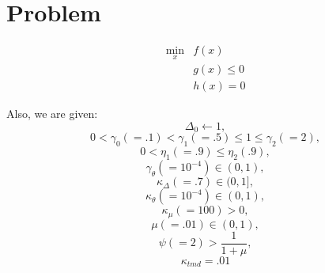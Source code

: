 \documentclass{article}
\begin{document}
%
\algnewcommand{\Goto}{\algorithmicgoto\xspace}%
\algnewcommand{\Label}{\State\unskip}



\section{Problem}
\begin{align*} 
\min_x & f(x) \\
 & g(x) \le 0 \\
 & h(x) = 0
\end{align*}

Also, we are given:
\[ \Delta_0 \gets 1,						\]
\[ 0 < \gamma_0 (=.1)< \gamma_1 (=.5)\le 1 \le \gamma_2(=2),	\]
\[ 0 < \eta_1 (=.9)\le \eta_2(.9),				\]
\[ \gamma_{\theta} (=10^{-4})\in (0, 1),			\]
\[ \kappa_{\Delta} (=.7) \in (0, 1],				\]
\[ \kappa_{\theta}(=10^{-4}) \in (0,1),				\]
\[ \kappa_{\mu} (=100) > 0,					\]
\[ \mu (=.01)\in (0,1),						\]
\[ \psi (=2)> \frac 1 {1+\mu},					\]
\[ \kappa_{tmd}=.01 						\]

\newpage
\end{document}
